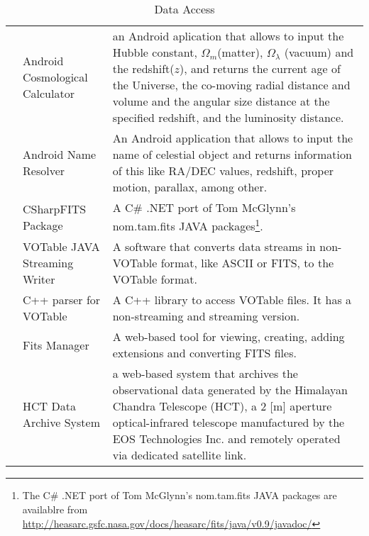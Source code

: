 \begin{table*}[h!t]
\begin{tabular}{|l|l|p{12.5cm}|}
			& Android Cosmological Calculator & an Android aplication that allows to input the Hubble constant, $ \Omega_{m} $(matter), $ \Omega_{\lambda} 
									$ (vacuum) and the redshift($ z $), and returns the current age of the Universe, the co-moving radial distance and 
									volume and the angular size distance at the specified redshift, and the luminosity distance.\\
			& Android Name Resolver & An Android application that allows to input the name of celestial object and returns information of this like 
									RA/DEC values, redshift, proper motion, parallax, among other.\\
			& CSharpFITS Package & A C\# .NET port of Tom McGlynn's nom.tam.fits JAVA packages\footnote{The C\# .NET port of Tom McGlynn's nom.tam.fits 
									JAVA packages are availablre from \url{http://heasarc.gsfc.nasa.gov/docs/heasarc/fits/java/v0.9/javadoc/}}.\\
			& VOTable JAVA Streaming Writer & A software that converts data streams in non-VOTable format, like ASCII or FITS, to the VOTable format. \\
			& C++ parser for VOTable & A C++ library to access VOTable files. It has a non-streaming and streaming version.\\
			& Fits Manager & A web-based tool for viewing, creating, adding extensions and converting FITS files.\\
			& HCT Data Archive System & a web-based system that archives the observational data generated by the Himalayan Chandra Telescope (HCT), a 2 [m]
									 aperture optical-infrared telescope manufactured by the EOS Technologies Inc. and remotely operated via dedicated
									 satellite link.\\
	\hline
	\end{tabular}
	\caption{Data Access}
	\label{table:integrantes}
\end{table*}


